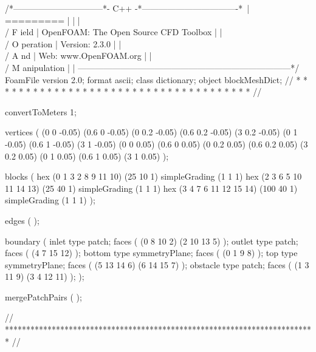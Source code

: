 \begin{OFverbatim}
/*--------------------------------*- C++ -*----------------------------------*\
| =========                 |                                                 |
| \\      /  F ield         | OpenFOAM: The Open Source CFD Toolbox           |
|  \\    /   O peration     | Version:  2.3.0                                 |
|   \\  /    A nd           | Web:      www.OpenFOAM.org                      |
|    \\/     M anipulation  |                                                 |
\*---------------------------------------------------------------------------*/
FoamFile
{
    version     2.0;
    format      ascii;
    class       dictionary;
    object      blockMeshDict;
}
// * * * * * * * * * * * * * * * * * * * * * * * * * * * * * * * * * * * * * //

convertToMeters 1;

vertices        
(
    (0 0 -0.05)
    (0.6 0 -0.05)
    (0 0.2 -0.05)
    (0.6 0.2 -0.05)
    (3 0.2 -0.05)
    (0 1 -0.05)
    (0.6 1 -0.05)
    (3 1 -0.05)
    (0 0 0.05)
    (0.6 0 0.05)
    (0 0.2 0.05)
    (0.6 0.2 0.05)
    (3 0.2 0.05)
    (0 1 0.05)
    (0.6 1 0.05)
    (3 1 0.05)
);

blocks          
(
    hex (0 1 3 2 8 9 11 10) (25 10 1) simpleGrading (1 1 1)
    hex (2 3 6 5 10 11 14 13) (25 40 1) simpleGrading (1 1 1)
    hex (3 4 7 6 11 12 15 14) (100 40 1) simpleGrading (1 1 1)
);

edges           
(
);

boundary
(
    inlet
    {
        type patch;
        faces
        (
            (0 8 10 2)
            (2 10 13 5)
        );
    }
    outlet
    {
        type patch;
        faces
        (
            (4 7 15 12)
        );
    }
    bottom
    {
        type symmetryPlane;
        faces
        (
            (0 1 9 8)
        );
    }
    top
    {
        type symmetryPlane;
        faces
        (
            (5 13 14 6)
            (6 14 15 7)
        );
    }
    obstacle
    {
        type patch;
        faces
        (
            (1 3 11 9)
            (3 4 12 11)
        );
    }
);

mergePatchPairs
(
);

// ************************************************************************* //
\end{OFverbatim}


